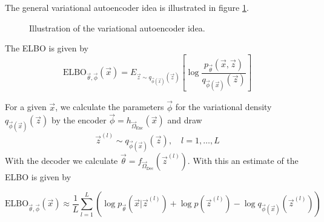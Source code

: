 
The general variational autoencoder idea is illustrated in figure \ref{fig:vae}.

\begin{figure}[!htb]
    \centering
    
    \caption{Illustration of the variational autoencoder idea.}
    \label{fig:vae}
\end{figure}

The ELBO is given by
\begin{equation}
    \text{ELBO}_{\vec{\theta}, \vec{\phi}}(\vec{x}) = E_{\vec{z} \sim q_{\vec{\phi}(\vec{x})}(\vec{z})} \left[ \log \frac{p_\vec{\theta}(\vec{x},\vec{z})}{q_{\vec{\phi}(\vec{x})}(\vec{z})} \right]
\end{equation}

For a given $\vec{x}$, we calculate the parameters $\vec{\phi}$ for the variational density $q_{\vec{\phi}(\vec{x})}(\vec{z})$ by the encoder
${\vec{\phi}} = h_{\vec{\Omega}_{\text{Enc}}}(\vec{x})$ and draw
\begin{equation}
    \vec{z}^{(l)} \sim q_{\vec{\phi}(\vec{x})}(\vec{z}), \quad l = 1,\dots,L
\end{equation}
With the decoder we calculate $\vec{\theta} = f_{\vec{\Omega}_{\text{Dec}}}(\vec{z}^{(l)})$. With this 
an estimate of the ELBO is given by

\begin{equation}
    \text{ELBO}_{\vec{\theta}, \vec{\phi}}(\vec{x}) \approx \frac{1}{L} \sum_{l=1}^{L} \left(\log p_{\vec{\theta}}(\vec{x}|\vec{z}^{(l)}) + \log p(\vec{z}^{(l)}) - \log q_{\vec{\phi}(\vec{x})}(\vec{z}^{(l)})\right)
\end{equation}



